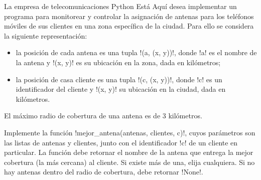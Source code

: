 La empresa de telecomunicaciones Python Está Aquí
desea implementar un programa
para monitorear y controlar la asignación de antenas
para los teléfonos móviles de sus clientes
en una zona específica de la ciudad.
Para ello se considera la siguiente representación:
\begin{itemize}
  \item la posición de cada antena es una tupla \li!(a, (x, y))!,
    donde \li!a! es el nombre de la antena
    y \li!(x, y)! es su ubicación en la zona, dada en kilómetros;
  \item la posición de casa cliente es una tupla \li!(c, (x, y))!,
    donde \li!c! es un identificador del cliente
    y \li!(x, y)! su ubicación en la ciudad, dada en kilómetros.
\end{itemize}
El máximo radio de cobertura de una antena es de 3 kilómetros.

Implemente la función \li!mejor_antena(antenas, clientes, c)!,
cuyos parámetros son las listas de antenas y clientes,
junto con el identificador \li!c!
de un cliente en particular.
La función debe retornar el nombre de la antena
que entrega la mejor cobertura (la más cercana) al cliente.
Si existe más de una, elija cualquiera.
Si no hay antenas dentro del radio de cobertura,
debe retornar \li!None!.



